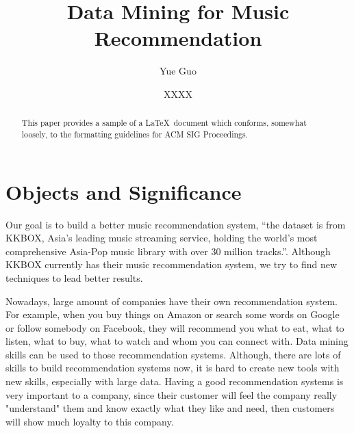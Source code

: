 \title{Data Mining for Music Recommendation}


\author{Yue Guo}


\author{XXXX}


\renewcommand{\shortauthors}{G. v. Laszewski}


\begin{abstract}
This paper provides a sample of a \LaTeX\ document which conforms,
somewhat loosely, to the formatting guidelines for
ACM SIG Proceedings.
\end{abstract}



\maketitle



\section{Objects and Significance}

Our goal is to build a better music recommendation system, ``the dataset is from KKBOX, Asia's leading music streaming service, holding the world's most comprehensive Asia-Pop music library with over 30 million tracks.''\cite{kaggle-kkbox-challenge}. Although KKBOX currently has their music recommendation system, we try to find new techniques to lead better results. 


Nowadays, large amount of companies have their own recommendation system. For example, when you buy things on Amazon or search some words on Google or follow somebody on Facebook, they will recommend you what to eat, what to listen, what to buy, what to watch and whom you can connect with. Data mining skills can be used to those recommendation systems. Although, there are lots of skills to build recommendation systems now, it is hard to create new tools with new skills, especially with large data. Having a good recommendation systems is very important to a company, since their customer will feel the company really "understand" them and know exactly what they like and need, then customers will show much loyalty to this company.




